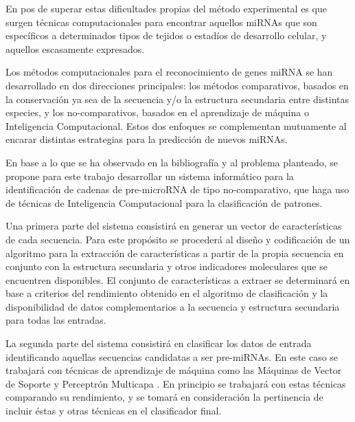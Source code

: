 \documentclass[12pt,bibliography=openstyle,DIV=12,parskip=full-]{scrartcl}
\begin{document}
En pos de superar estas dificultades propias del método experimental
es que surgen técnicas computacionales para encontrar aquellos miRNAs
que son específicos a determinados tipos de tejidos o estadíos de
desarrollo celular, y aquellos escasamente
expresados. \cite{sheng}\cite{xu}

Los métodos computacionales para el reconocimiento de genes miRNA se
han desarrollado en dos direcciones principales: los métodos
comparativos, basados en la conservación ya sea de la secuencia y/o la
estructura secundaria entre distintas especies, y los no-comparativos,
basados en el aprendizaje de máquina o Inteligencia
Computacional. Estos dos enfoques se complementan mutuamente al
encarar distintas estrategias para la predicción de nuevos
miRNAs. \cite{batuwita}\cite{sheng}

En base a lo que se ha observado en la bibliografía y al problema
planteado, se propone para este trabajo desarrollar un sistema
informático para la identificación de cadenas de pre-microRNA de tipo
no-comparativo, que haga uso de técnicas de Inteligencia Computacional
para la clasificación de patrones.

Una primera parte del sistema consistirá en generar un vector de
características de cada secuencia. Para este propósito se procederá al
diseño y codificación de un algoritmo para la extracción de
características a partir de la propia secuencia en conjunto con la
estructura secundaria y otros indicadores moleculares que se
encuentren disponibles. El conjunto de características a extraer se
determinará en base a criterios del rendimiento obtenido en el
algoritmo de clasificación y la disponibilidad de datos
complementarios a la secuencia y estructura secundaria para todas las
entradas.

La segunda parte del sistema consistirá en clasificar los datos de
entrada identificando aquellas secuencias candidatas a ser
pre-miRNAs. En este caso se trabajará con técnicas de aprendizaje de
máquina como las Máquinas de Vector de Soporte \cite{svm} y Perceptrón
Multicapa \cite{mlp1}\cite{mlp2}. En principio se trabajará con estas
técnicas comparando su rendimiento, y se tomará en consideración la
pertinencia de incluir éstas y otras técnicas en el clasificador
final.
\end{document}
